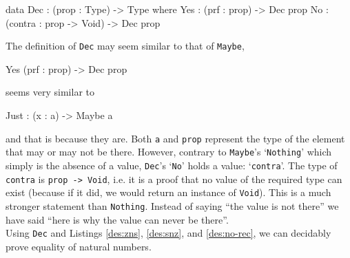     \begin{code}[caption={\texttt{Dec} as defined in the \Idris prelude}]
            data Dec : (prop : Type) -> Type where
                Yes : (prf : prop) -> Dec prop
                No  : (contra : prop -> Void) -> Dec prop
    \end{code}
    The definition of \texttt{Dec} may seem similar to that of \texttt{Maybe},
    
    \begin{code}
        Yes (prf : prop) -> Dec prop
    \end{code}
    seems very similar to
    
    \begin{code}
        Just : (x : a) -> Maybe a
    \end{code}
    and that is because they are. Both \texttt{a} and \texttt{prop} represent the type of the element that may or may not be there. However, contrary to \texttt{Maybe}'s `\texttt{Nothing}' which simply is the absence of a value, \texttt{Dec}'s `\texttt{No}' holds a value: `\texttt{contra}'. The type of \texttt{contra} is \texttt{prop -> Void}, i.e. it is a proof that no value of the required type can exist (because if it did, we would return an instance of \texttt{Void}). This is a much stronger statement than \texttt{Nothing}. Instead of saying ``the value is not there'' we have said ``here is why the value can never be there''.
    \\
        
    Using \texttt{Dec} and Listings \ref{des:zns}, \ref{des:snz}, and \ref{des:no-rec}, we can decidably prove equality of natural numbers.

